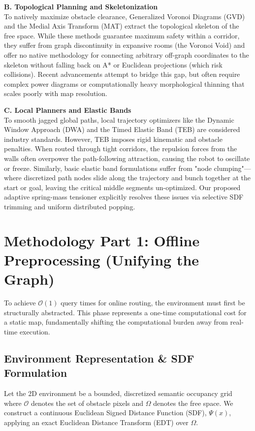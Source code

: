 \documentclass[letterpaper, 10 pt, conference]{IEEEtran}
\begin{document}
\textbf{B. Topological Planning and Skeletonization} \\
To natively maximize obstacle clearance, Generalized Voronoi Diagrams (GVD) and the Medial Axis Transform (MAT) extract the topological skeleton of the free space. While these methods guarantee maximum safety within a corridor, they suffer from graph discontinuity in expansive rooms (the Voronoi Void) and offer no native methodology for connecting arbitrary off-graph coordinates to the skeleton without falling back on A* or Euclidean projections (which risk collisions). Recent advancements attempt to bridge this gap, but often require complex power diagrams or computationally heavy morphological thinning that scales poorly with map resolution.

\textbf{C. Local Planners and Elastic Bands} \\
To smooth jagged global paths, local trajectory optimizers like the Dynamic Window Approach (DWA) and the Timed Elastic Band (TEB) are considered industry standards. However, TEB imposes rigid kinematic and obstacle penalties. When routed through tight corridors, the repulsion forces from the walls often overpower the path-following attraction, causing the robot to oscillate or freeze. Similarly, basic elastic band formulations suffer from "node clumping"—where discretized path nodes slide along the trajectory and bunch together at the start or goal, leaving the critical middle segments un-optimized. Our proposed adaptive spring-mass tensioner explicitly resolves these issues via selective SDF trimming and uniform distributed popping.

\section{Methodology Part 1: Offline Preprocessing (Unifying the Graph)}
To achieve $\mathcal{O}(1)$ query times for online routing, the environment must first be structurally abstracted. This phase represents a one-time computational cost for a static map, fundamentally shifting the computational burden away from real-time execution.

\subsection{Environment Representation \& SDF Formulation}
Let the 2D environment be a bounded, discretized semantic occupancy grid where $\mathcal{O}$ denotes the set of obstacle pixels and $\Omega$ denotes the free space. We construct a continuous Euclidean Signed Distance Function (SDF), $\Psi(x)$, applying an exact Euclidean Distance Transform (EDT) over $\Omega$. 
\end{document}

